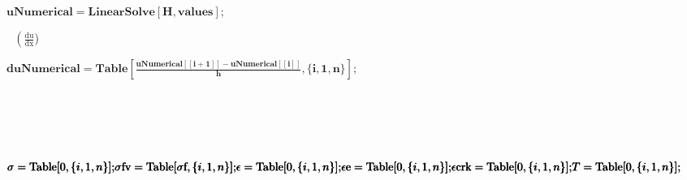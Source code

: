 \documentclass{article}
\newcommand{\unicode}[1]{{}}
\begin{document}
$\unicode{0427}\unicode{0438}\unicode{0441}\unicode{043b}\unicode{0435}\unicode{043d}\unicode{043d}\unicode{043e}$ $\unicode{043d}\unicode{0430}\unicode{0439}\unicode{0434}\unicode{0435}\unicode{043d}\unicode{043d}\unicode{044b}\unicode{0435}$
$\unicode{0437}\unicode{043d}\unicode{0430}\unicode{0447}\unicode{0435}\unicode{043d}\unicode{0438}\unicode{044f}$ $\unicode{043f}\unicode{0435}\unicode{0440}\unicode{0435}\unicode{043c}\unicode{0435}\unicode{0449}\unicode{0435}\unicode{043d}\unicode{0438}\unicode{0439}$
$\unicode{043f}\unicode{0443}\unicode{0442}\unicode{0435}\unicode{043c}$ $\unicode{0440}\unicode{0435}\unicode{0448}\unicode{0435}\unicode{043d}\unicode{0438}\unicode{044f}$
$\unicode{0414}\unicode{0423}$ 

\begin{doublespace}
\noindent\(\pmb{\text{uNumerical} =\text{LinearSolve}[H, \text{values}] ;}\)
\end{doublespace}

$\unicode{041d}\unicode{0430}\unicode{0445}\unicode{043e}\unicode{0436}\unicode{0434}\unicode{0435}\unicode{043d}\unicode{0438}\unicode{0435}$ $\unicode{0434}\unicode{0435}\unicode{0444}\unicode{043e}\unicode{0440}\unicode{043c}\unicode{0430}\unicode{0446}\unicode{0438}\unicode{0439}$
\(\left(\frac{\text{du}}{\text{dx}}\right.\))

\begin{doublespace}
\noindent\(\pmb{\text{duNumerical} = \text{Table}\left[\frac{\text{uNumerical}[[i+1]] - \text{uNumerical}[[i]]}{h}, \{i, 1, n\}\right] ;}\)
\end{doublespace}

\section*{$\unicode{0420}\unicode{0435}\unicode{0448}\unicode{0435}\unicode{043d}\unicode{0438}\unicode{0435}$ $\unicode{043d}\unicode{0430}$ $\unicode{043a}\unicode{0430}\unicode{0436}\unicode{0434}\unicode{043e}\unicode{043c}$
$\unicode{0432}\unicode{0440}\unicode{0435}\unicode{043c}\unicode{0435}\unicode{043d}\unicode{043d}\unicode{043e}\unicode{043c}$ $\unicode{0441}\unicode{043b}\unicode{043e}\unicode{0435}$}

\begin{doublespace}
\noindent\(\pmb{\sigma  = \text{Table}[0,\{i, 1, n\}];}\\
\pmb{\text{$\sigma $fv} = \text{Table}[\text{$\sigma $f},\{i, 1, n\}];}\\
\pmb{\epsilon  = \text{Table}[0,\{i, 1, n\}]; }\\
\pmb{\text{$\epsilon $e} = \text{Table}[0,\{i, 1, n\}]; }\\
\pmb{\text{$\epsilon $crk} = \text{Table}[0,\{i, 1, n\}];}\\
\pmb{T = \text{Table}[0,\{i, 1, n\}];}\)
\end{doublespace}
\end{document}
